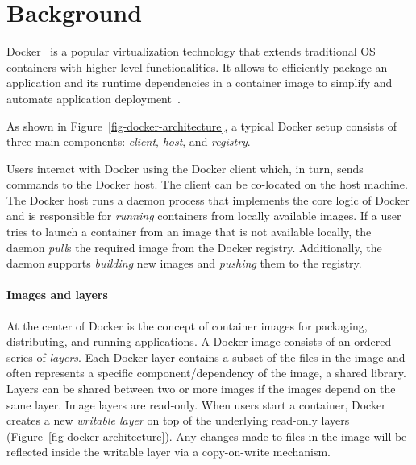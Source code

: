\section{Background}
\label{sec:background}

Docker~\cite{docker} is a popular virtualization technology
that extends traditional OS containers with higher level
functionalities.
%
It allows to efficiently package an application and its runtime dependencies
in a container image to simplify and automate application deployment~\cite{slacker}.
%
%

%
As shown in Figure~\ref{fig-docker-architecture}, a typical
Docker setup consists of three main components: \emph{client},
\emph{host}, and \emph{registry}.

Users interact with Docker using the Docker client which, in turn,
sends commands to the Docker host.
%
The client can be co-located on the host machine.
%
The Docker host runs a daemon process that implements the core logic of Docker and
is responsible for \emph{running} containers from locally available
images.
%
If a user tries to launch a container from an image that is not available
locally, the daemon \emph{pull}s the required image from the Docker registry.
%
Additionally, the daemon supports \emph{building} new images and \emph{pushing}
them to the registry.

\paragraph{Images and layers}
%
At the center of Docker is the concept of container images for packaging,
distributing, and running applications.
%
A Docker image consists of an ordered series of \emph{layers}.
%
Each Docker layer contains a subset of the files in the image and often represents a
specific component/dependency of the image, \eg a shared library.
%
Layers can be shared between two or more images if
the images depend on the same layer.
%
Image layers are read-only.
%
When users start a container, Docker creates a new
\emph{writable layer} on top of the underlying read-only layers
(Figure~\ref{fig-docker-architecture}).
%
Any changes made to files in the image will be reflected inside the writable
layer via a copy-on-write mechanism.
%
%

